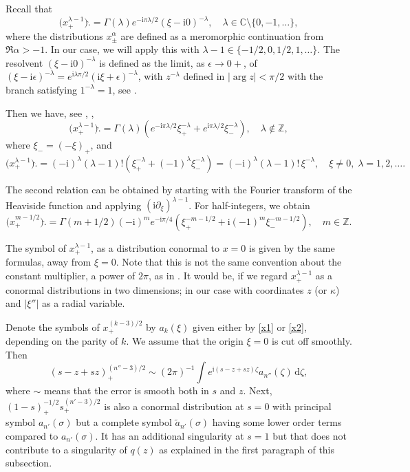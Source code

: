 \documentclass[11pt]{amsart}
\theoremstyle{definition}
\theoremstyle{remark}
\numberwithin{equation}{section}
\renewcommand{\d}{\,\mathrm{d}}
\newcommand{\I}{\mathrm{i}}
\begin{document}
Recall that 
\[
\big(x_+^{\lambda-1}\big)\hat{\big.} = \Gamma(\lambda)  e^{-\I \pi \lambda/2} (\xi-\I 0)^{-\lambda}  , \quad \lambda \in\mathbb{C}\setminus\{0,-1,\dots\},
\]
where the distributions $x_\pm^{\alpha}$ are defined as a meromorphic continuation from $\Re\alpha>-1$.  
In our case, we will apply this with $\lambda-1\in \{ -1/2,0,1/2,1,\dots \}$. The resolvent $(\xi-\I 0)^{-\lambda}$ is defined as the limit, as $\epsilon\to0+$, of $(\xi-\I\epsilon)^{-\lambda} = e^{\I \lambda \pi/2}(\I \xi+\epsilon)^{-\lambda}$, with $z^{-\lambda}$ defined in $|\arg z|<\pi/2$ with the branch satisfying $1^{-\lambda}=1$, see \cite[Example~7.1.17]{Hormander1}. 

Then we have, see \cite[p.~110]{Friedlander1998}, \cite[p.~72]{Hormander1},
\[
\big(x_+^{\lambda-1}\big)\hat{\big.} = \Gamma(\lambda) \left( e^{-\I \pi \lambda/2} \xi_+^{-\lambda} + e^{\I \pi \lambda/2} \xi_-^{-\lambda} \right), \quad \lambda \not\in\mathbb{Z},
\]
where $\xi_-=(-\xi)_+$, and
\begin{equation}\label{x1}
\big(x_+^{\lambda-1}\big)\hat{\big.} = (-\I)^\lambda (\lambda-1)! \left(  \xi_+^{-\lambda} +  (-1)^\lambda \xi_-^{-\lambda} \right) = (-\I)^\lambda (\lambda-1)! \,  \xi^{-\lambda}, \quad \xi\not=0, \; \lambda =1,2,\dots.
\end{equation}

The second relation can be obtained by starting with the Fourier transform of the Heaviside function and applying $(\I \partial_\xi)^{\lambda-1}$. For half-integers, we obtain
\begin{equation}\label{x2}
\big(x_+^{m-1/2}\big)\hat{\big.} = \Gamma(m+1/2) (-\I)^m e^{-\I\pi/4} \left(   \xi_+^{-m-1/2} + \I (-1)^m   \xi_-^{-m-1/2} \right), \quad m \in\mathbb{Z}.
\end{equation}

The symbol of $x_+^{\lambda-1}$, as a distribution conormal to $x=0$ is given by the same formulas, away from $\xi=0$. Note that this is not the same convention about the constant multiplier, a power of $2\pi$, as in \cite{Hormander3}. It would be, if we regard $x_+^{\lambda-1}$ as a conormal distributions in two dimensions; in our case with coordinates $z$ (or $\kappa$) and $|\xi''|$ as a radial variable. 

Denote the symbols of $x_+^{(k-3)/2}$ by $a_{k}(\xi)$ given either by \eqref{x1} or \eqref{x2}, depending on the parity of $k$. We assume that the origin $\xi=0$ is cut off smoothly.  
Then 
\[
(s-z +sz)_+^{(n''-3)/2}  \sim (2\pi)^{-1} \int e^{\I (s-z +sz)\zeta} a_{n''}(\zeta)\d \zeta,
\]
where $\sim$ means that the error is smooth both in $s$ and $z$. 
Next, $(1-s)_+^{-1/2} s_+^{(n'-3)/2} $ is also a  conormal distribution at $s=0$ with principal symbol $a_{n'}(\sigma)$  but a complete symbol $\tilde a_{n'}(\sigma) $ having some lower order terms compared to  $a_{n'}(\sigma)$. It has an additional singularity at $s=1$ but that does not contribute to a singularity of $	q(z)$ as explained in the first paragraph of this subsection. 
 
\end{document}
